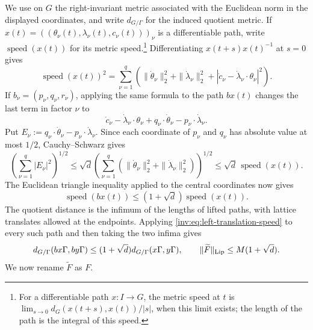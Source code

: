 \documentclass[twoside]{aomart}
\makeatletter
\theoremstyle{paperplain}
\theoremstyle{paperdefinition}
\renewenvironment{proof}[1][\proofname]{\par\pushQED{\qed}%
  \normalfont\topsep6\p@\@plus3\p@\relax\trivlist
  \item[\hskip\labelsep\itshape #1\@addpunct{.}]\ignorespaces
}{\popQED\endtrivlist\@endpefalse}
\numberwithin{equation}{section}
\makeatother
\begin{document}
\begin{proof}
We use on $G$ the right-invariant metric associated with the Euclidean
norm in the displayed coordinates, and write $d_{G/\Gamma}$ for the
induced quotient metric. If
$x(t)=((\theta_\nu(t),\lambda_\nu(t),c_\nu(t)))_\nu$ is a differentiable
path, write $\operatorname{speed}(x(t))$ for its metric speed.\footnote{For
a differentiable path $x:I\to G$, the metric speed at $t$ is
$\displaystyle\lim_{s\to0}d_G(x(t+s),x(t))/|s|$, when this limit exists;
the length of the path is the integral of this speed.}
Differentiating $x(t+s)x(t)^{-1}$ at $s=0$ gives
\begin{equation}
 \operatorname{speed}(x(t))^2
 =\sum_{\nu=1}^{q}\left(
 \|\dot\theta_\nu\|_2^2+\|\dot\lambda_\nu\|_2^2+
 |\dot c_\nu-\dot\lambda_\nu\cdot\theta_\nu|^2\right).
\label{inv:eq:speed-formula}
\end{equation}
If $b_\nu=(p_\nu,q_\nu,r_\nu)$, applying the same formula to the
path $b x(t)$ changes the last term in factor $\nu$ to
\[
 \dot c_\nu-\dot\lambda_\nu\cdot\theta_\nu
 +q_\nu\cdot\dot\theta_\nu-p_\nu\cdot\dot\lambda_\nu.
\]
Put $E_\nu:=q_\nu\cdot\dot\theta_\nu-p_\nu\cdot\dot\lambda_\nu$. Since each coordinate of $p_\nu$ and $q_\nu$ has absolute value at most $1/2$, Cauchy--Schwarz gives
\begin{equation*}
 \left(\sum_{\nu=1}^{q}|E_\nu|^2\right)^{1/2}
 \le \sqrt d\left(\sum_{\nu=1}^{q}
 (\|\dot\theta_\nu\|_2^2+\|\dot\lambda_\nu\|_2^2)\right)^{1/2}
 \le \sqrt d\,\operatorname{speed}(x(t)).
\end{equation*}
The Euclidean triangle inequality applied to the central coordinates now gives
\begin{equation}
 \operatorname{speed}(b x(t))
 \le(1+\sqrt d)\operatorname{speed}(x(t)).
\label{inv:eq:left-translation-speed}
\end{equation}
The quotient distance is the infimum of the lengths of lifted paths,
with lattice translates allowed at the endpoints. Applying
\eqref{inv:eq:left-translation-speed} to every such path and then taking
the two infima gives
\begin{equation}
 d_{G/\Gamma}(bx\Gamma,by\Gamma)
 \le(1+\sqrt d)d_{G/\Gamma}(x\Gamma,y\Gamma),
 \qquad
 \|\widetilde F\|_{\rm Lip}\le M(1+\sqrt d).
\label{inv:eq:translated-lipschitz}
\end{equation}
We now rename $\widetilde F$ as $F$.


\end{proof}
\end{document}
